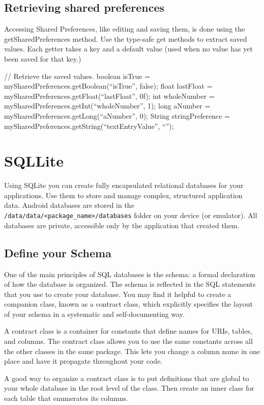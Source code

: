 \subsection{Retrieving shared preferences}
Accessing Shared Preferences, like editing and saving them, is done using the getSharedPreferences method. Use the type-safe get methods to extract saved values. Each getter takes a key and a default value (used when no value has yet been saved for that key.)

\begin{android}
// Retrieve the saved values.
boolean isTrue = mySharedPreferences.getBoolean(“isTrue”, false);
float lastFloat = mySharedPreferences.getFloat(“lastFloat”, 0f);
int wholeNumber = mySharedPreferences.getInt(“wholeNumber”, 1);
long aNumber = mySharedPreferences.getLong(“aNumber”, 0);
String stringPreference =
mySharedPreferences.getString(“textEntryValue”, “”);
\end{android}

\section{SQLLite}
Using SQLite you can create fully encapsulated relational databases for your applications. Use them to store and manage complex, structured application data. Android databases are stored in the \texttt{/data/data/<package\_name>/databases} folder on your device (or emulator). All databases are private, accessible only by the application that created them.

\subsection{Define your Schema}
One of the main principles of SQL databases is the schema: a formal declaration of how the database is organized. The schema is reflected in the SQL statements that you use to create your database. You may find it helpful to create a companion class, known as a contract class, which explicitly specifies the layout of your schema in a systematic and self-documenting way.

A contract class is a container for constants that define names for URIs, tables, and columns. The contract class allows you to use the same constants across all the other classes in the same package. This lets you change a column name in one place and have it propagate throughout your code.

A good way to organize a contract class is to put definitions that are global to your whole database in the root level of the class. Then create an inner class for each table that enumerates its columns.

